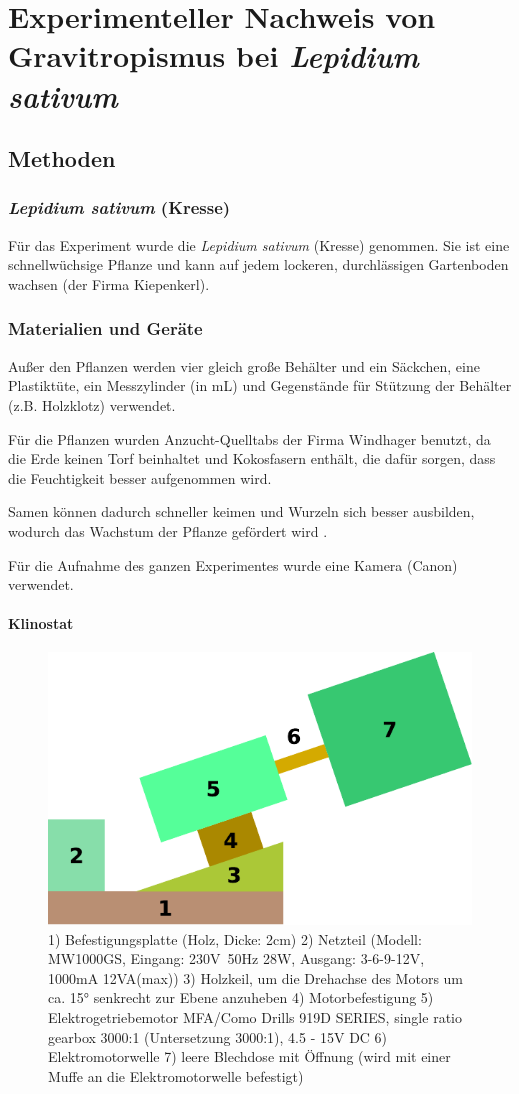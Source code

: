\documentclass[
11pt, 
ngerman,
listof=totocnumbered,
oneside,
bibliography=totocnumbered,
abstracton
]{scrreprt}
\begin{document}
\chapter{Experimenteller Nachweis von Gravitropismus bei \emph{Lepidium sativum}}

\section{Methoden}

\subsection{\emph{Lepidium sativum} (Kresse)}

Für das Experiment wurde die \emph{Lepidium sativum} (Kresse) genommen. Sie ist eine schnellwüchsige Pflanze und kann auf jedem lockeren, durchlässigen Gartenboden wachsen (der Firma Kiepenkerl).


\subsection{Materialien und Geräte}

Außer den Pflanzen werden vier gleich große Behälter und ein Säckchen, eine Plastiktüte, ein Messzylinder (in mL) und Gegenstände für Stützung der Behälter (z.B. Holzklotz) verwendet.

Für die Pflanzen wurden Anzucht-Quelltabs der Firma Windhager benutzt, da die Erde keinen Torf beinhaltet und Kokosfasern enthält, die dafür sorgen, dass die Feuchtigkeit besser aufgenommen wird.

Samen können dadurch schneller keimen und Wurzeln sich besser ausbilden, wodurch das Wachstum der Pflanze gefördert wird \parencite{Windhager}. 

Für die Aufnahme des ganzen Experimentes wurde eine Kamera (Canon) verwendet.


\subsubsection{Klinostat}

 \begin{figure}[H]
 	\centering 
 	\includegraphics[width = 0.5\linewidth]{images/drawing-1.pdf}
 	\caption{1) Befestigungsplatte (Holz, Dicke: 2cm) 2) Netzteil (Modell: MW1000GS, Eingang: 230V~50Hz 28W, Ausgang: 3-6-9-12V, 1000mA 12VA(max)) 3) Holzkeil, um die Drehachse des Motors um ca. \ang{15} senkrecht zur Ebene anzuheben 4) Motorbefestigung 5) Elektrogetriebemotor MFA/Como Drills 919D SERIES, single ratio gearbox 3000:1 (Untersetzung 3000:1), 4.5 - 15V DC	6) Elektromotorwelle 7) leere Blechdose mit Öffnung (wird mit einer Muffe an die Elektromotorwelle befestigt)}
 \end{figure} 
\end{document}
